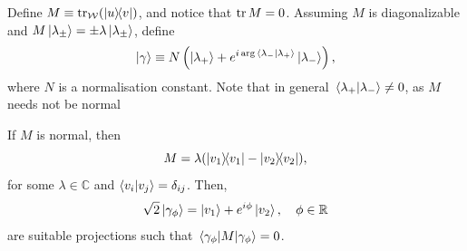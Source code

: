 \documentclass[
	aps, pra,
	superscriptaddress, twocolumn,
	floatfix,
	10pt
]{revtex4-1}
\newcommand{\parTitle}[1]{\noindent{\color{Mahogany}(\emph{#1})}}
\newcommand{\CC}{\mathbb{C}}
\newcommand{\RR}{\mathbb{R}}
\newcommand{\calW}{{\mathcal{W}}}
\newcommand{\LI}[1]{\highlight{(LI: \textit{#1})}}
\newcommand{\commale}[1]{{\textcolor{red} {\it{[Note (Ale): #1]}}}}
\renewcommand{\parTitle}[1]{}
\begin{document}
Define $M\equiv \tr_{\calW}(\ketbra{u}{v})$, and notice that $\tr M=0$.
Assuming $M$ is diagonalizable and $M\ket{\lambda_\pm}=\pm\lambda\ket{\lambda_\pm}$, define
\begin{equation}
    \ket\gamma\equiv N\left(
        \ket{\lambda_+} +
        e^{i\arg\braket*{\lambda_-}{\lambda_+}} \ket{\lambda_-}
    \right),
    \label{eq:definition_projgamma_2dcase}
\end{equation}
where $N$ is a normalisation constant. Note that in general $\braket*{\lambda_+}{\lambda_-}\neq0$, as $M$ needs not be normal 

\parTitle{Proof for $M$ normal}
If $M$ is normal, then
\begin{equation}
	M = \lambda( \ketbra{v_1} - \ketbra{v_2}),
\end{equation}
for some $\lambda\in\CC$ and $\braket{v_i}{v_j}=\delta_{ij}$.
Then,
\begin{equation}
	\sqrt2\ket{\gamma_\phi} = \ket{v_1} + e^{i\phi}\ket{v_2}, \quad \phi\in\RR
\end{equation}
are suitable projections such that $\mel{\gamma_\phi}{M}{\gamma_\phi}=0$.
\end{document}
